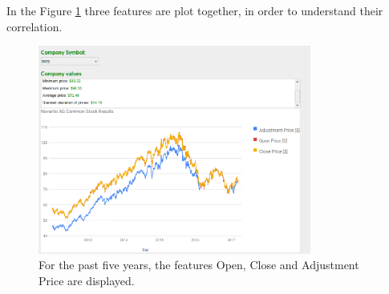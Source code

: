 In the Figure \ref{fig:nvs_stock_results} three features are plot together, in order to understand their correlation.
\begin{figure}[H]
\centering
\includegraphics[width=0.8\textwidth]{figures/nvs_stock_results2.png}
\caption{\label{fig:data}For the past five years, the features Open, Close and Adjustment Price are displayed.}
\label{fig:nvs_stock_results}
\end{figure}

